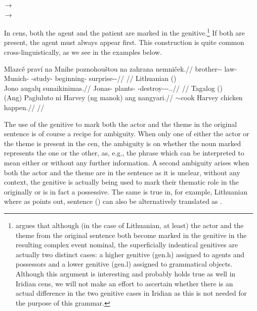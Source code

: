 \pex
    \a {}\,→\,\\
    \a {}\,→\,\\
\xe

In {\sc cen}s, both the agent and the patient are marked in the
genitive.\footnote{\textcite{serekaite2020} argues that although
(in the case of Lithuanian, at least) the actor and the theme from the original
sentence both become marked in the genitive in the resulting complex event
nominal, the superficially indentical genitives are actually two distinct cases:
a higher genitive ({\sc gen.h}) assigned to agents and possessors and a lower
genitive ({\sc gen.l}) assigned to grammatical objects. Although this argument
is interesting and probably holds true as well in Iridian {\sc cen}s, we will
not make an effort to ascertain whether there is an actual difference in the two
genitive cases in Iridian as this is not needed for the purpose of this
grammar.} If both are present, the agent must always appear first. This
construction is quite common cross-linguistically, as we see in the examples
below.

\pex
\a\begingl
    \gla Mlazcě praví na Mnihe poznohouštou na zahrana nemniček.//
    \glb brother-\Dim{}-\Gen{} law-\Gen{} \Loc{} Munich-\Acc{} \Ger{}-study-\Nz{} \Loc{} beginning-\Acc{} surprise-\Av{}-\Pf{}//
    \glft {}//
\endgl
\a Lithuanian (\cite[1]{serekaite2020})\\
\begingl
    \gla Jono augal\k{u} sunaikinimas.//
    \glb Jonas-\Gen{} plants-\Gen{} \Pfv{}-destroy-\Caus{}-\Nz-\Nom{}.\M{}.\Sg{}//
    \glft {}//
\endgl
\a Tagalog (\cite[22]{hsieh2019})\\
\begingl
    \gla (Ang) Pagluluto ni Harvey (ng manok) ang nangyari.//
    \glb \Nom{} \Ger{}$\sim$cook \Gen{} Harvey \Gen{} chicken \Nom{} happen.\Pfv{}//
    \glft {}//
\endgl
\xe

The use of the genitive to mark both the actor and the theme in
the original sentence is of course a recipe for ambiguity. When only one of
either the actor or the theme is present in the {\sc cen}, the ambiguity is on
whether the noun marked represents the one or the other, as, e.g., the phrase
 which can be interpreted to mean either  or  without any further
information. A second ambiguity arises when both the actor and the theme are in
the sentence as it is unclear, without any context, the genitive is actually
being used to mark their thematic role in the originally or is in fact a
possessive. The same is true in, for example, Lithuanian where
as \textcite{serekaite2020} points out, sentence
() can also be alternatively translated as
.

